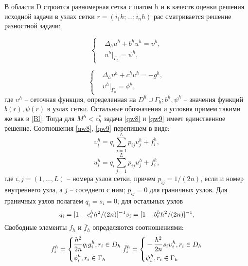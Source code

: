 В области D строится равномерная сетка с шагом h и в качеств
оценки решения исходной задачи в узлах сетки $r = (i_{1}h; \dots ; i_{n}h)$ рас
сматривается решение разностной задачи:

\begin{equation} 
	\left\{
\begin{aligned}
&\Delta_{h} u^{h} + b^{h}u^{h} =\upsilon^{h}, \\
&u^{h}|_{\Gamma_{h}} = \psi^{h},
\end{aligned}
 \right. \label{qw8}
\end{equation}

\begin{equation} 
	\left\{
\begin{aligned}
&\Delta_{h} \upsilon^{h} + c^{h}\upsilon^{h} =-g^{h},\\  & \upsilon^{h}|_{\Gamma_{h}} = \phi^{h}, 
\end{aligned}
 \right. \label{qw9}
\end{equation}
где $\upsilon^{h}$ -- сеточная функция, определенная на $D^{h} \cup \Gamma_{h}; b^{h}, \psi^{h}$ --  значения функций $b(r), \psi(r)$ в узлах сетки. Остальные обозначения и условия
примем такими же как в \ref{Bl}. Тогда для $M^{h} < c^{*}_{h}$  задача \ref{qw8} и \ref{qw9}
имеет единственное решение.
Соотношения \ref{qw8}, \ref{qw9} перепишем в виде:
\begin{equation}
	\upsilon^{h}_{i}=q_{i}\sum^{L}_{j=1}{p_{ij}\upsilon^{h}_{j}}+f^{h}_{i},
\end{equation}
\begin{equation}
	u^{h}_{i}=q_{i}\sum^{L}_{j=1}{p_{ij}u^{h}_{j}}+f^{h}_{i},
\end{equation}
где $i,j=(1,\dots,L)$ --  номера узлов сетки, причем $p_{ij}=1/(2n)$, если и 
номер внутреннего узла, а $j$ --  соседнего с ним; $p_{ij}= 0$ для граничных
узлов. Для граничных узлов полагаем $q_{i}=s_{i}=0$; для остальных узлов
\begin{equation}
	q_{i}=[1-c^{h}_{i}h^{2}/(2n)]^{-1} \\ s_{i}=[1-b^{h}_{i}h^{2}/(2n)]^{-1},
\end{equation}
Свободные элементы $f_{h}$ и 
$\bar{f}_{h}$ определяются соотношениями:
\begin{equation}
	f^{h}_{i}= 
	\left\{
\begin{aligned}
& \frac{h^{2}}{2n}q_{i}g^{h}_{i}, r_{i} \in D_{h}\\ & \phi^{h}_{i}, r_{i} \in \Gamma_{h}
\end{aligned}
 \right.\\
\bar{f}^{h}_{i}= 
	\left\{
\begin{aligned}
& -\frac{h^{2}}{2n}s_{i}\upsilon^{h}_{i}, r_{i} \in D_{h}\\ & \psi^{h}_{i}, r_{i} \in \Gamma_{h}
\end{aligned}
 \right.
\end{equation}
